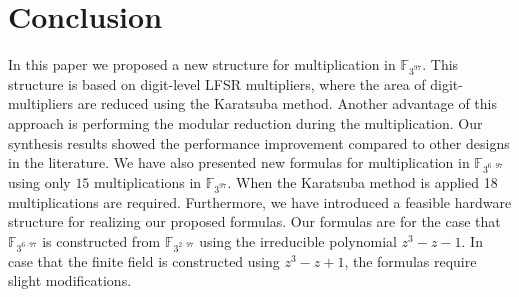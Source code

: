 \documentclass{article}
\newcommand{\F}{\mathbb{F}}
\begin{document}
\section{Conclusion}
\label{sec:conclusion}

In this paper we proposed a new structure for multiplication in
$\F_{3^{97}}$. This structure is based on digit-level LFSR multipliers, 
where the area of digit-multipliers are reduced using the Karatsuba
method. 
Another advantage of this approach is performing the modular reduction
during the multiplication. Our synthesis results showed the
performance improvement compared to other designs in the
literature. We have also presented new formulas for multiplication in
$\F_{3^{6 \cdot 97}}$ using only $15$ multiplications in
$\F_{3^{97}}$.
When the Karatsuba method is applied 18 multiplications are required.
Furthermore, we have introduced a feasible hardware structure for realizing our proposed formulas. Our formulas are for the case that $\F_{3^{6 \cdot 97}}$ is
constructed from $\F_{3^{2 \cdot 97}}$ using the irreducible
polynomial $z^3-z-1$. In case that the finite field is constructed using
$z^3-z+1$, the formulas require slight modifications.

\small
\end{document}
